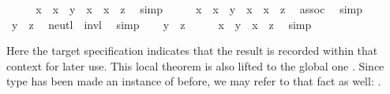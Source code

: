 \begin{isabellebody}
\ \ \isamarkupfalse%
\ \isamarkupfalse%
\ {\isachardoublequoteopen}x{\isasymdiv}\ {\isasymotimes}\ {\isacharparenleft}x\ {\isasymotimes}\ y{\isacharparenright}\ {\isacharequal}\ x{\isasymdiv}\ {\isasymotimes}\ {\isacharparenleft}x\ {\isasymotimes}\ z{\isacharparenright}{\isachardoublequoteclose}\ \isamarkupfalse%
\ simp\isanewline
\ \ \isamarkupfalse%
\ \isamarkupfalse%
\ {\isachardoublequoteopen}{\isacharparenleft}x{\isasymdiv}\ {\isasymotimes}\ x{\isacharparenright}\ {\isasymotimes}\ y\ {\isacharequal}\ {\isacharparenleft}x{\isasymdiv}\ {\isasymotimes}\ x{\isacharparenright}\ {\isasymotimes}\ z{\isachardoublequoteclose}\ \isamarkupfalse%
\ assoc\ \isamarkupfalse%
\ simp\isanewline
\ \ \isamarkupfalse%
\ \isamarkupfalse%
\ {\isachardoublequoteopen}y\ {\isacharequal}\ z{\isachardoublequoteclose}\ \isamarkupfalse%
\ neutl\ \ invl\ \isamarkupfalse%
\ simp\isanewline
{}\isamarkupfalse%
\isanewline
\ \ \isamarkupfalse%
\ {\isachardoublequoteopen}y\ {\isacharequal}\ z{\isachardoublequoteclose}\isanewline
\ \ \isamarkupfalse%
\ \isamarkupfalse%
\ {\isachardoublequoteopen}x\ {\isasymotimes}\ y\ {\isacharequal}\ x\ {\isasymotimes}\ z{\isachardoublequoteclose}\ \isamarkupfalse%
\ simp\isanewline
{}\isamarkupfalse%
%
\endisatagquote
{\isafoldquote}%
%
\isadelimquote
%
\endisadelimquote
%
\begin{isamarkuptext}%
\noindent Here the  target
  specification indicates that the result is recorded within that
  context for later use.  This local theorem is also lifted to the
  global one \hyperlink{fact.group.left-cancel:}{\mbox{}} .  Since type  has been
  made an instance of  before, we may refer to that
  fact as well: .%
\end{isamarkuptext}%

\end{isabellebody}
